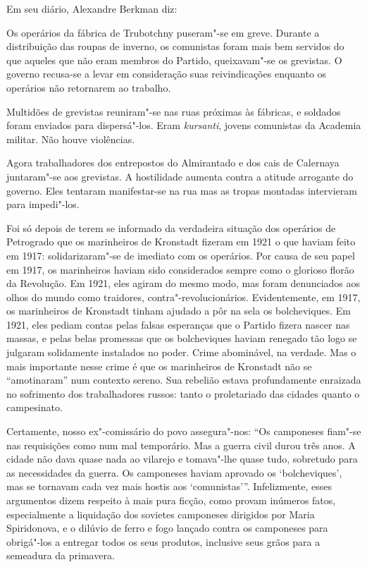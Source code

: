 Em seu diário, Alexandre Berkman diz:

\begin{hedraquote}
Os operários da fábrica de
Trubotchny puseram"-se em greve. Durante a distribuição das roupas de
inverno, os comunistas foram mais bem servidos do que aqueles que não eram
membros do Partido, queixavam"-se os grevistas. O governo recusa-se a levar
em consideração suas reivindicações enquanto os operários não
retornarem ao trabalho. 

Multidões de grevistas reuniram"-se nas ruas
próximas às fábricas, e soldados foram enviados para dispersá"-los.
Eram \textit{kursanti}, jovens comunistas da Academia militar. Não houve
violências.

Agora trabalhadores dos entrepostos do Almirantado e dos cais de
Calernaya juntaram"-se aos grevistas. A hostilidade aumenta contra a
atitude arrogante do governo. Eles tentaram manifestar-se na rua mas as
tropas montadas intervieram para impedi"-los.
\end{hedraquote}

Foi só depois de terem se informado da verdadeira situação dos operários
de Petrogrado que os marinheiros de Kronstadt fizeram em 1921 o que
haviam feito em 1917: solidarizaram"-se de imediato com os operários.
Por causa de seu papel em 1917, os marinheiros haviam sido considerados
sempre como o glorioso florão da Revolução. Em 1921, eles agiram do
mesmo modo, mas foram denunciados aos olhos do mundo como traidores,
contra"-revolucionários. Evidentemente, em 1917, os marinheiros de
Kronstadt tinham ajudado a pôr na sela os bolcheviques. Em 1921, eles
pediam contas pelas falsas esperanças que o Partido fizera nascer nas
massas, e pelas belas promessas que os bolcheviques haviam renegado tão
logo se julgaram solidamente instalados no poder. Crime abominável, na
verdade. Mas o mais importante nesse crime é que os marinheiros de
Kronstadt não se “amotinaram” num contexto sereno. Sua rebelião estava
profundamente enraizada no sofrimento dos trabalhadores russos: tanto o
proletariado das cidades quanto o campesinato.

Certamente, nosso ex"-comissário do povo assegura"-nos: “Os camponeses
fiam"-se nas requisições como num mal temporário. Mas a guerra civil
durou três anos. A cidade não dava quase nada ao vilarejo e
tomava"-lhe quase tudo, sobretudo para as necessidades da guerra. Os
camponeses haviam aprovado os ‘bolcheviques’, mas se tornavam cada vez
mais hostis aos ‘comunistas’”. Infelizmente, esses argumentos dizem
respeito à mais pura ficção, como provam inúmeros fatos, especialmente a
liquidação dos sovietes camponeses dirigidos por Maria Spiridonova, e o 
dilúvio de ferro e fogo lançado contra os camponeses para obrigá"-los
a entregar todos os seus produtos, inclusive seus grãos para a
semeadura da primavera.

